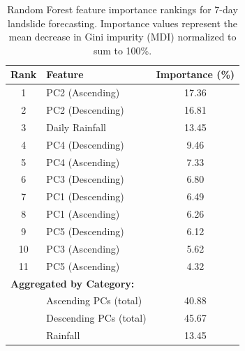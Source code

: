 \begin{table}[htbp]
\centering
\caption{Random Forest feature importance rankings for 7-day landslide forecasting. Importance values represent the mean decrease in Gini impurity (MDI) normalized to sum to 100\%.}
\label{tab:feature_importance}
\begin{tabular}{clc}
\toprule
\textbf{Rank} & \textbf{Feature} & \textbf{Importance (\%)} \\
\midrule
1 & PC2 (Ascending) & 17.36 \\
2 & PC2 (Descending) & 16.81 \\
3 & Daily Rainfall & 13.45 \\
4 & PC4 (Descending) & 9.46 \\
5 & PC4 (Ascending) & 7.33 \\
6 & PC3 (Descending) & 6.80 \\
7 & PC1 (Descending) & 6.49 \\
8 & PC1 (Ascending) & 6.26 \\
9 & PC5 (Descending) & 6.12 \\
10 & PC3 (Ascending) & 5.62 \\
11 & PC5 (Ascending) & 4.32 \\
\midrule
\multicolumn{3}{l}{\textbf{Aggregated by Category:}} \\
\midrule
& Ascending PCs (total) & 40.88 \\
& Descending PCs (total) & 45.67 \\
& Rainfall & 13.45 \\
\bottomrule
\end{tabular}
\end{table}

